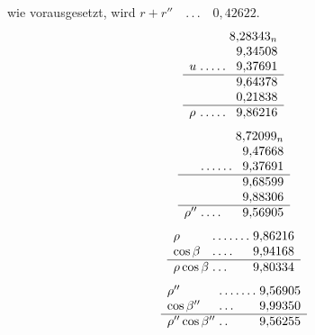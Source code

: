 \noindent wie vorausgesetzt, wird \(r+r''\quad\mathord{.}\,\mathord{.}\,\mathord{.}\quad0{,}42622\).
\[
\begin{array}{l@{\;}l@{\;}r}
&&8{,}28343_n\\
&&9{,}34508\\
u&\mathord{.}\,\mathord{.}\,\mathord{.}\,\mathord{.}\,\mathord{.}&9{,}37691\\\hline
&&9{,}64378\\
&&0{,}21838\\\hline
\rho&\mathord{.}\,\mathord{.}\,\mathord{.}\,\mathord{.}\,\mathord{.}&9{,}86216
\end{array}
\]
\[
\begin{array}{l@{\;}l@{\;}r}
&&8{,}72099_n\\
&&9{,}47668\\
&\mathord{.}\,\mathord{.}\,\mathord{.}\,\mathord{.}\,\mathord{.}\,\mathord{.}&9{,}37691\\\hline
&&9{,}68599\\
&&9{,}88306\\\hline
\rho''&\mathord{.}\,\mathord{.}\,\mathord{.}\,\mathord{.}&9{,}56905
\end{array}
\]
\[
\begin{array}{l@{\;}l@{\;}r}
\rho&\mathord{.}\,\mathord{.}\,\mathord{.}\,\mathord{.}\,\mathord{.}\,\mathord{.}\,\mathord{.}&9{,}86216\\
\cos\beta&\mathord{.}\,\mathord{.}\,\mathord{.}\,\mathord{.}&9{,}94168\\\hline
\rho\cos\beta&\mathord{.}\,\mathord{.}\,\mathord{.}&9{,}80334
\end{array}
\]
\[
\begin{array}{l@{\;}l@{\;}r}
\rho''&\mathord{.}\,\mathord{.}\,\mathord{.}\,\mathord{.}\,\mathord{.}\,\mathord{.}\,\mathord{.}&9{,}56905\\
\cos\beta''&\mathord{.}\,\mathord{.}\,\mathord{.}&9{,}99350\\\hline
\rho''\cos\beta''&\mathord{.}\,\mathord{.}&9{,}56255
\end{array}
\]

